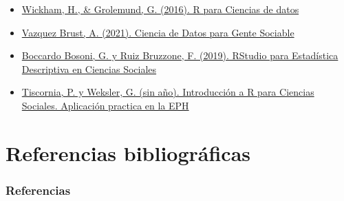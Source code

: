 \documentclass[
]{article}
\begin{document}
\begin{itemize}
\item
  \href{https://es.r4ds.hadley.nz/}{Wickham, H., \& Grolemund, G. (2016). R para Ciencias de datos}
\item
  \href{https://bitsandbricks.github.io/ciencia_de_datos_gente_sociable/}{Vazquez Brust, A. (2021). Ciencia de Datos para Gente Sociable}
\item
  \href{https://bookdown.org/gboccardo/manual-ED-UCH/}{Boccardo Bosoni, G. y Ruiz Bruzzone, F. (2019). RStudio para Estadística Descriptiva en Ciencias Sociales}
\item
  \href{https://guidowe.github.io/Curso-R-Flacso/}{Tiscornia, P. y Weksler, G. (sin año). Introducción a R para Ciencias Sociales. Aplicación practica en la EPH}
\end{itemize}

\hypertarget{part-referencias-bibliogruxe1ficas}{%
\part{Referencias bibliográficas}\label{part-referencias-bibliogruxe1ficas}}

\hypertarget{referencias}{%
\section*{Referencias}\label{referencias}}
\end{document}
